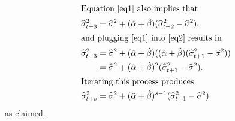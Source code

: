 \documentclass[11pt, a4paper]{article}
\begin{document}
\begin{enumerate}
\begin{enumerate}
\begin{align}
\intertext{Equation \eqref{eq1} also implies that}
\widehat{\sigma} _{t+3}^{2}&=\widehat{\sigma} ^{2}+(\hat\alpha+\hat\beta) (\widehat{\sigma}_{t+2}^{2}-\widehat{\sigma} ^{2}),\label{eq2}\\
\intertext{and plugging \eqref{eq1} into \eqref{eq2} results in}
\widehat{\sigma} _{t+3}^{2}&=\widehat{\sigma} ^{2}+(\hat\alpha+\hat\beta) ((\hat\alpha+\hat\beta) (\widehat{\sigma}_{t+1}^{2}-\widehat{\sigma} ^{2}))\notag\\
&=\widehat{\sigma} ^{2}+(\hat\alpha+\hat\beta)^2 (\widehat{\sigma}_{t+1}^{2}-\widehat{\sigma} ^{2}).\notag\\
\intertext{Iterating this process produces}
\widehat{\sigma} _{t+s}^{2}&=\widehat{\sigma} ^{2}+(\hat\alpha+\hat\beta)^{s-1} (\widehat{\sigma}_{t+1}^{2}-\widehat{\sigma} ^{2})\notag
\end{align}
as claimed.

\end{enumerate}
\end{enumerate}
\end{document}
